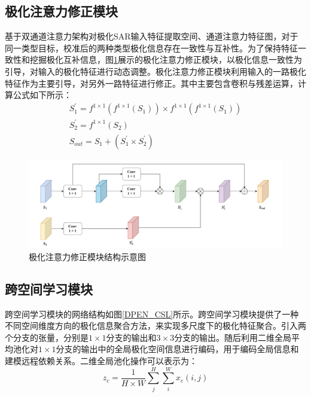 \subsection{极化注意力修正模块}
基于双通道注意力架构对极化SAR输入特征提取空间、通道注意力特征图，对于同一类型目标，校准后的两种类型极化信息存在一致性与互补性。为了保持特征一致性和挖掘极化互补信息，图\ref{DPEN_WFM}展示的极化注意力修正模块，以极化信息一致性为引导，对输入的极化特征进行动态调整。极化注意力修正模块利用输入的一路极化特征作为主要引导，对另外一路特征进行修正。其中主要包含卷积与残差运算，计算公式如下所示：
\begin{gather}
    S_{1}^{\prime}=f^{1\times 1}\left( f^{1\times 1}\left( S_1 \right) \right) \times f^{1\times 1}\left( f^{1\times 1}\left( S_1 \right) \right)
    \\
    S_{2}^{\prime}=f^{1\times 1}\left( S_2 \right)
    \\
    S_{out}=S_1+\left( S_{1}^{\prime}\times S_{2}^{\prime} \right)
\end{gather}

\begin{figure}[h]
    \centering
    \includegraphics[width=14cm]{pic/chapter3/极化注意力修正.pdf}
    \caption{极化注意力修正模块结构示意图}
    \label{DPEN_WFM}
\end{figure}


\subsection{跨空间学习模块}
跨空间学习模块的网络结构如图\ref{DPEN_CSL}所示。跨空间学习模块提供了一种不同空间维度方向的极化信息聚合方法，来实现多尺度下的极化特征聚合。引入两个分支的张量，分别是$1\times 1$分支的输出和$3 \times 3$分支的输出。随后利用二维全局平均池化对$1\times 1$分支的输出中的全局极化空间信息进行编码，用于编码全局信息和建模远程依赖关系。二维全局池化操作可以表示为：
\begin{equation}
    z_c=\frac{1}{H\times W}\sum_{j}^{H}\sum_{i}^{W}x_c(i,j)
\end{equation}

